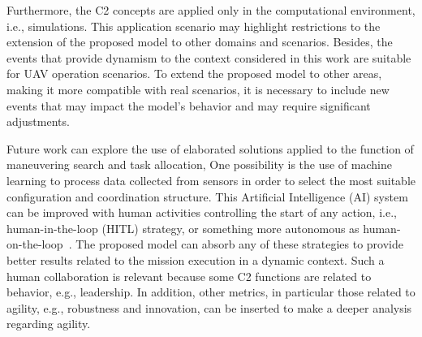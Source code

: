 Furthermore, the C2 concepts are applied only in the computational environment, i.e., simulations. This application scenario may highlight restrictions to the extension of the proposed model to other domains and scenarios. Besides, the events that provide dynamism to the context considered in this work are suitable for UAV operation scenarios. To extend the proposed model to other areas, making it more compatible with real scenarios, it is necessary to include new events that may impact the model's behavior and may require significant adjustments.

Future work can explore the use of elaborated solutions applied to the function of maneuvering search and task allocation,  One possibility is the use of machine learning to process data collected from sensors in order to select the most suitable configuration and coordination structure. This Artificial Intelligence (AI) system can be improved with human activities controlling the start of any action, i.e., human-in-the-loop (HITL) strategy, or something more autonomous as human-on-the-loop~\citep{HITL01}. The proposed model can absorb any of these strategies to provide better results related to the mission execution in a dynamic context. Such a human collaboration is relevant because some C2 functions are related to behavior, e.g., leadership. In addition, other metrics, in particular those related to agility, e.g., robustness and innovation, can be inserted to make a deeper analysis regarding agility. 

